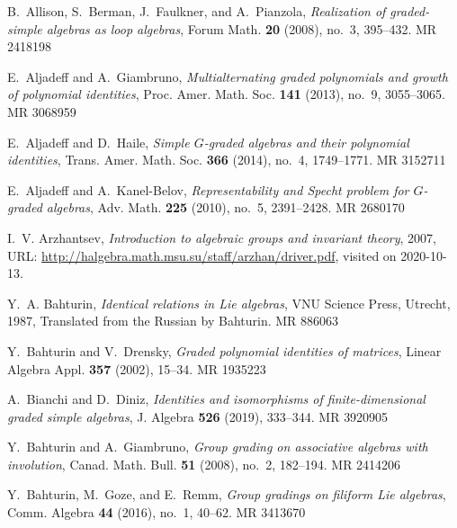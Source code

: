 \documentclass[12pt]{pdfathesis}
\begin{document}
\def\cprime{$'$}
\providecommand{\bysame}{\leavevmode\hbox to3em{\hrulefill}\thinspace}
\providecommand{\MR}{\relax\ifhmode\unskip\space\fi MR }
\providecommand{\MRhref}[2]{%
  \href{http://www.ams.org/mathscinet-getitem?mr=#1}{#2}
}
\providecommand{\href}[2]{#2}
\begin{thebibliography}{BHDSK17}

B.~Allison, S.~Berman, J.~Faulkner, and A.~Pianzola, \emph{Realization of
  graded-simple algebras as loop algebras}, Forum Math. \textbf{20} (2008),
  no.~3, 395--432. \MR{2418198}

E.~Aljadeff and A.~Giambruno, \emph{Multialternating graded polynomials and
  growth of polynomial identities}, Proc. Amer. Math. Soc. \textbf{141} (2013),
  no.~9, 3055--3065. \MR{3068959}

E.~Aljadeff and D.~Haile, \emph{Simple {$G$}-graded algebras and their
  polynomial identities}, Trans. Amer. Math. Soc. \textbf{366} (2014), no.~4,
  1749--1771. \MR{3152711}

E.~Aljadeff and A.~Kanel-Belov, \emph{Representability and {S}pecht problem for
  {$G$}-graded algebras}, Adv. Math. \textbf{225} (2010), no.~5, 2391--2428.
  \MR{2680170}

I.~V. Arzhantsev, \emph{Introduction to algebraic groups and invariant theory},
  2007, URL: \url{http://halgebra.math.msu.su/staff/arzhan/driver.pdf}, visited
  on 2020-10-13.

Y.~A. Bahturin, \emph{Identical relations in {L}ie algebras}, VNU Science
  Press, Utrecht, 1987, Translated from the Russian by Bahturin. \MR{886063}

Y.~Bahturin and V.~Drensky, \emph{Graded polynomial identities of matrices},
  Linear Algebra Appl. \textbf{357} (2002), 15--34. \MR{1935223}

A.~Bianchi and D.~Diniz, \emph{Identities and isomorphisms of
  finite-dimensional graded simple algebras}, J. Algebra \textbf{526} (2019),
  333--344. \MR{3920905}

Y.~Bahturin and A.~Giambruno, \emph{Group grading on associative algebras with
  involution}, Canad. Math. Bull. \textbf{51} (2008), no.~2, 182--194.
  \MR{2414206}

Y.~Bahturin, M.~Goze, and E.~Remm, \emph{Group gradings on filiform {L}ie
  algebras}, Comm. Algebra \textbf{44} (2016), no.~1, 40--62. \MR{3413670}


\end{thebibliography}
\end{document}
